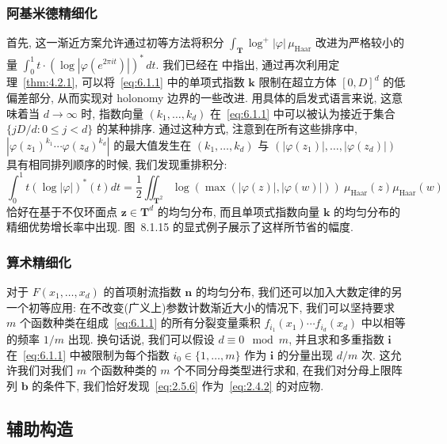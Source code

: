 \subsubsection{阿基米德精细化}\label{sec:6.1.3}

首先, 这一渐近方案允许通过初等方法将积分 $\int_{\mathbf{T}} \log^+ |\varphi| \, \mu_{\text{Haar}}$ 改进为严格较小的量 $\int_0^1 t \cdot (\log |\varphi(e^{2\pi it})|)^* \, dt$.
我们已经在 \cite[§ 2.3.3]{CDT21} 中指出, 通过再次利用定理~\ref{thm:4.2.1}, 可以将~\eqref{eq:6.1.1} 中的单项式指数 $\mathbf{k}$ 限制在超立方体 $[0,D]^d$ 的低偏差部分, 从而实现对 holonomy 边界的一些改进.
用具体的启发式语言来说, 这意味着当 $d \to \infty$ 时, 指数向量 $(k_1,\ldots,k_d)$ 在~\eqref{eq:6.1.1} 中可以被认为接近于集合 $\{jD/d:0\le j< d\}$ 的某种排序.
通过这种方式, 注意到在所有这些排序中, $|\varphi(z_1)^{k_1}\cdots\varphi(z_d)^{k_d}|$ 的最大值发生在 $(k_1,\ldots,k_d)$ 与 $(|\varphi(z_1)|,\ldots,|\varphi(z_d)|)$ 具有相同排列顺序的时候, 我们发现重排积分:
\begin{equation}\label{eq:6.1.4}
\int_{0}^{1} t (\log |\varphi|)^{*}(t) dt = \frac{1}{2} \iint_{\mathbf{T}^{2}} \log (\max(|\varphi(z)|, |\varphi(w)|)) \ \mu_{\text{Haar}}(z) \mu_{\text{Haar}}(w)
\end{equation}
恰好在基于不仅环面点 $\mathbf{z} \in \mathbf{T}^d$ 的均匀分布, 而且单项式指数向量 $\mathbf{k}$ 的均匀分布的精细优势增长率中出现.
图~8.1.15 的显式例子展示了这样所节省的幅度.

\subsubsection{算术精细化}\label{sec:6.1.5}

对于 $F(x_1,\ldots,x_d)$ 的首项射流指数 $\mathbf{n}$ 的均匀分布, 我们还可以加入大数定律的另一个初等应用: 在不改变(广义上)参数计数渐近大小的情况下, 我们可以坚持要求 $m$ 个函数种类在组成~\eqref{eq:6.1.1} 的所有分裂变量乘积 $f_{i_1}(x_1)\cdots f_{i_d}(x_d)$ 中以相等的频率 $1/m$ 出现.
换句话说, 我们可以假设 $d \equiv 0 \mod m$, 并且求和多重指数 $\mathbf{i}$ 在~\eqref{eq:6.1.1} 中被限制为每个指数 $i_0 \in \{1,\ldots,m\}$ 作为 $\mathbf{i}$ 的分量出现 $d/m$ 次.
这允许我们对我们 $m$ 个函数种类的 $m$ 个不同分母类型进行求和, 在我们对分母上限阵列 $\mathbf{b}$ 的条件下, 我们恰好发现~\eqref{eq:2.5.6} 作为~\eqref{eq:2.4.2} 的对应物.

\subsection{辅助构造}\label{sec:6.2}


